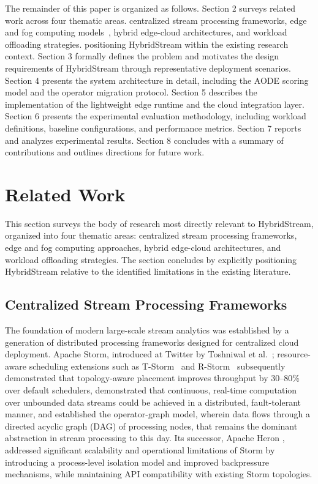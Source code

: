 \documentclass[preprint,review,12pt]{elsarticle}
\begin{document}
The remainder of this paper is organized as follows. Section 2 surveys related work across four thematic areas. centralized stream processing frameworks, edge and fog computing models~\cite{yousefpour2019all}, hybrid edge-cloud architectures, and workload offloading strategies. positioning HybridStream within the existing research context. Section 3 formally defines the problem and motivates the design requirements of HybridStream through representative deployment scenarios. Section 4 presents the system architecture in detail, including the AODE scoring model and the operator migration protocol. Section 5 describes the implementation of the lightweight edge runtime and the cloud integration layer. Section 6 presents the experimental evaluation methodology, including workload definitions, baseline configurations, and performance metrics. Section 7 reports and analyzes experimental results. Section 8 concludes with a summary of contributions and outlines directions for future work.



\section{Related Work}\label{related-work}

This section surveys the body of research most directly relevant to HybridStream, organized into four thematic areas: centralized stream processing frameworks, edge and fog computing approaches, hybrid edge-cloud architectures, and workload offloading strategies. The section concludes by explicitly positioning HybridStream relative to the identified limitations in the existing literature.

\subsection{Centralized Stream Processing Frameworks}\label{centralized-stream-processing-frameworks}

The foundation of modern large-scale stream analytics was established by a generation of distributed processing frameworks designed for centralized cloud deployment. Apache Storm, introduced at Twitter by Toshniwal et al.~\cite{toshniwal2014storm}; resource-aware scheduling extensions such as T-Storm~\cite{xu2014tstorm} and R-Storm~\cite{peng2015r} subsequently demonstrated that topology-aware placement improves throughput by 30--80\% over default schedulers, demonstrated that continuous, real-time computation over unbounded data streams could be achieved in a distributed, fault-tolerant manner, and established the operator-graph model, wherein data flows through a directed acyclic graph (DAG) of processing nodes, that remains the dominant abstraction in stream processing to this day. Its successor, Apache Heron \cite{kulkarni2015heron}, addressed significant scalability and operational limitations of Storm by introducing a process-level isolation model and improved backpressure mechanisms, while maintaining API compatibility with existing Storm topologies.
\end{document}
